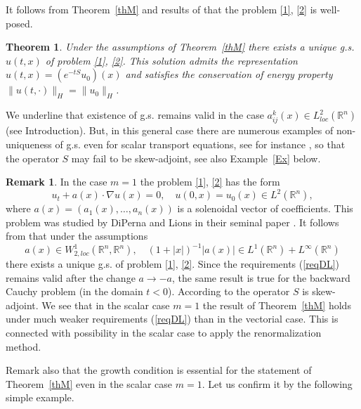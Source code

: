 \documentclass[12pt]{article}
\theoremstyle{plain}
\newtheorem{theorem}{Theorem}[section]
\theoremstyle{definition}
\newtheorem{remark}{Remark}[section]
\numberwithin{equation}{section}
\newcommand{\R}{{\mathbb R}}
\begin{document}
It follows from Theorem~\ref{thM} and results of \cite{Zap} that the problem \eqref{1}, \eqref{2} is well-posed.

\begin{theorem}\label{wp} Under the assumptions of Theorem~\ref{thM} there exists a unique g.s. $u(t,x)$ of problem \eqref{1}, \eqref{2}. This solution admits the representation $u(t,x)=(e^{-tS} u_0)(x)$ and satisfies the conservation of energy property $\|u(t,\cdot)\|_H=\|u_0\|_H$.
\end{theorem}

We underline that existence of g.s. remains valid in the case $a^k_{ij}(x)\in L^2_{loc}(\R^n)$ (see Introduction).
But, in this  general case there are numerous examples of non-uniqueness of g.s. even for scalar transport equations, see for instance \cite{Aiz,Br,CLR,Dep,PaTr}, so that the operator $S$ may fail to be skew-adjoint, see also Example~\ref{Ex} below.

\begin{remark}\label{rem1}
In the case $m=1$ the problem \eqref{1}, \eqref{2} has the form
\begin{equation}\label{1-1}
u_t+a(x)\cdot\nabla u(x)=0, \quad u(0,x)=u_0(x)\in L^2(\R^n),
\end{equation}
where $a(x)=(a_1(x),\ldots,a_n(x))$ is a solenoidal vector of coefficients. This problem was studied by DiPerna and Lions in their seminal paper \cite{DiL}. It follows from \cite[Corollary~II.1]{DiL} that under the assumptions
\begin{equation}\label{reqDL}
a(x)\in W^1_{2,loc}(\R^n,\R^n), \quad (1+|x|)^{-1}|a(x)|\in L^1(\R^n)+L^\infty(\R^n)
\end{equation}
there exists a unique g.s. of problem \eqref{1}, \eqref{2}. Since the requirements (\ref{reqDL}) remains valid after the change $a\to -a$, the same result is true for the backward Cauchy problem (in the domain $t<0$). According to \cite[Corollary~3.1]{Zap} the operator $S$ is skew-adjoint. We see that in the scalar case $m=1$ the result of Theorem~\ref{thM} holds under much weaker requirements (\ref{reqDL}) than in the vectorial case. This is connected with
possibility in the scalar case to apply the renormalization method.
\end{remark}


Remark also that the growth condition is essential for the statement of Theorem~\ref{thM} even in the scalar case $m=1$.
Let us confirm it by the following simple example.
\end{document}

